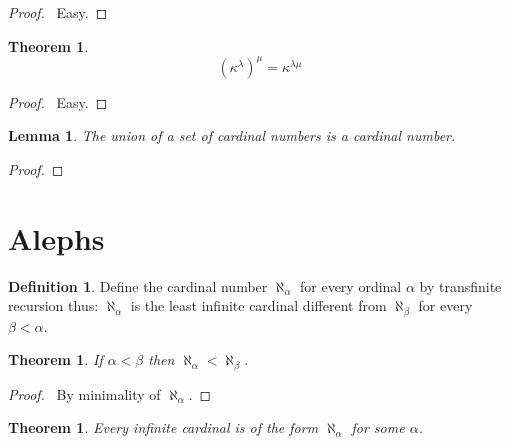 \documentclass{report}
\let\qed\relax
\newtheorem{lemma}[axiom]{Lemma}
\newtheorem{theorem}[axiom]{Theorem}
\theoremstyle{definition}
\newtheorem{definition}[axiom]{Definition}
\begin{document}
    \begin{proof}
        \pf\ Easy. \qed
    \end{proof}

    \begin{theorem}
        \[ (\kappa^\lambda)^\mu = \kappa^{\lambda \mu} \]
    \end{theorem}

    \begin{proof}
        \pf\ Easy. \qed
    \end{proof}

    \begin{lemma}
        The union of a set of cardinal numbers is a cardinal number.
    \end{lemma}

    \begin{proof}
        \pf
        \qed
    \end{proof}
    \section{Alephs}

    \begin{definition}
        Define the cardinal number $\aleph_\alpha$ for every ordinal $\alpha$ by transfinite recursion thus:
        $\aleph_\alpha$ is the least infinite cardinal different from $\aleph_\beta$ for every $\beta < \alpha$.
    \end{definition}

    \begin{theorem}
        If $\alpha < \beta$ then $\aleph_\alpha < \aleph_\beta$.
    \end{theorem}

    \begin{proof}
        \pf\ By minimality of $\aleph_\alpha$. \qed
    \end{proof}

    \begin{theorem}
        Every infinite cardinal is of the form $\aleph_\alpha$ for some $\alpha$.
    \end{theorem}
\end{document}
